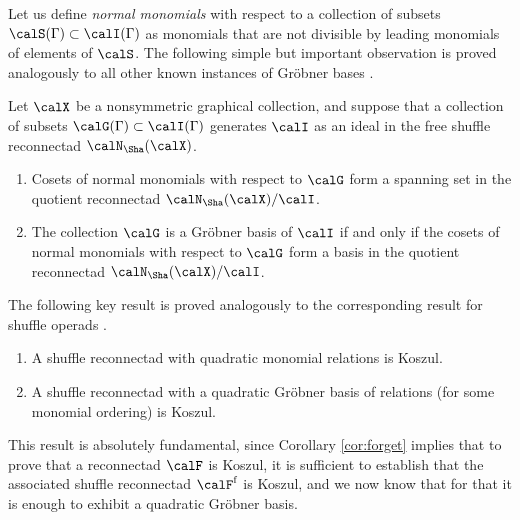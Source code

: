 Let us define \emph{normal monomials} with respect to a collection of subsets $\calS(\Gamma)\subset\calI(\Gamma)$ as monomials that are not divisible by leading monomials of elements of $\calS$. The following simple but important observation is proved analogously to all other known instances of Gr\"obner bases \cite{MR3642294}.

\begin{prop}\label{prop:normal} Let $\calX$ be a nonsymmetric graphical collection, and suppose that a collection of subsets $\calG(\Gamma)\subset\calI(\Gamma)$ generates $\calI$ as an ideal in the free shuffle reconnectad $\calN_{\Sha}(\calX)$.
\begin{enumerate}
\item Cosets of normal monomials with respect to $\calG$ form a spanning set in the quotient reconnectad $\calN_{\Sha}(\calX)/\calI$.
\item The collection $\calG$ is a Gr\"obner basis of $\calI$ if and only if the cosets of normal monomials with respect to $\calG$ form a basis in the quotient reconnectad $\calN_{\Sha}(\calX)/\calI$. 
\end{enumerate}
\end{prop}

The following key result is proved analogously to the corresponding result for shuffle operads \cite{MR3084563}.

\begin{prop}\label{prop:shuffleKoszul}\leavevmode
\begin{enumerate}
\item A shuffle reconnectad with quadratic monomial relations is Koszul.
\item A shuffle reconnectad with a quadratic Gr\"obner basis of relations (for some monomial ordering) is Koszul.
\end{enumerate}
\end{prop}

This result is absolutely fundamental, since Corollary \ref{cor:forget} implies that to prove that a reconnectad $\calF$ is Koszul, it is sufficient to establish that the associated shuffle reconnectad $\calF^{\mathrm{f}}$ is Koszul, and we now know that for that it is enough to exhibit a quadratic Gr\"obner basis.

